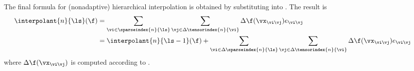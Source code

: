The final formula for (nonadaptive) hierarchical interpolation is obtained by
substituting  into
. The result is
\begin{align*}
  \interpolant{n}{\ls}(\f)
  &= \sum_{\vi \in \sparseindex{n}{\ls}} \sum_{\vj \in \Delta\tensorindex{n}{\vi}} \Delta\f(\vx_{\vi \vj}) e_{\vi \vj} \\
  &= \interpolant{n}{\ls - 1}(\f) + \sum_{\vi \in \Delta\sparseindex{n}{\ls}} \sum_{\vj \in \Delta\tensorindex{n}{\vi}} \Delta\f(\vx_{\vi \vj}) e_{\vi \vj}
\end{align*}
where $\Delta\f(\vx_{\vi \vj})$ is computed according to
.
